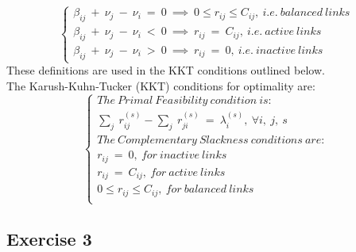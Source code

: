 \documentclass[12pt, draftcls, onecolumn]{IEEEtran}
\begin{document}
\begin{equation*}
    \begin{cases}
        \beta_{ij}\ +\ \nu_j\ -\ \nu_i\ =\ 0\ \implies\ 0 \leq r_{ij} \leq C_{ij},\ i.e.\ balanced\ links\\
        \beta_{ij}\ +\ \nu_j\ -\ \nu_i\ <\ 0\ \implies\ r_{ij}\ =\ C_{ij},\ i.e.\ active\ links\\
        \beta_{ij}\ +\ \nu_j\ -\ \nu_i\ >\ 0\ \implies\ r_{ij}\ =\ 0,\ i.e.\ inactive\ links
    \end{cases}
\end{equation*}
These definitions are used in the KKT conditions outlined below.
\\The Karush-Kuhn-Tucker (KKT) conditions for optimality are:
\begin{equation*}
    \begin{cases}
        The\ Primal\ Feasibility\ condition\ is:\\
        \sum_j\ r_{ij}^{(s)} - \sum_j\ r_{ji}^{(s)}\ =\ \lambda_i^{(s)},\ \forall i,\ j,\ s\\
        The\ Complementary\ Slackness\ conditions\ are:\\
        r_{ij}\ =\ 0,\ for\ inactive\ links\\
        r_{ij}\ =\ C_{ij},\ for\ active\ links\\
        0 \leq r_{ij} \leq C_{ij},\ for\ balanced\ links\\
    \end{cases}
\end{equation*}
\subsection{Exercise 3}
\end{document}
